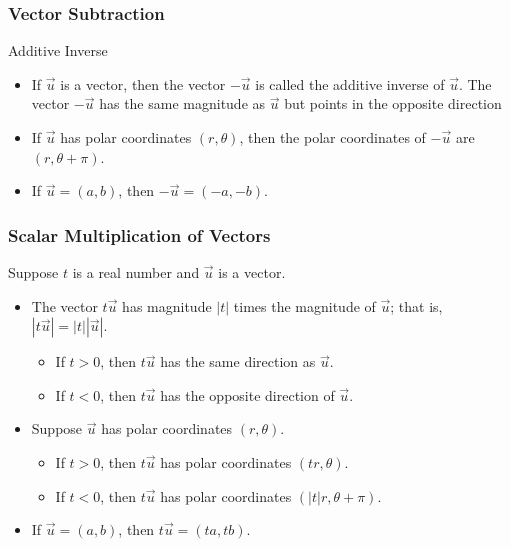 \documentclass{beamer}
\begin{document}
\begin{frame}
\frametitle{Vector Subtraction}
\begin{block}{Additive Inverse}
    \begin{itemize}
        \item If \(\vec u \) is a vector, then the vector \(-\vec u\) is called the additive inverse of \(\vec u\). The vector \(-\vec u\) has the same magnitude as \(\vec u\) but points in the opposite direction
        \item If \(\vec u\) has polar coordinates \((r, \theta)\), then the polar coordinates of \(-\vec u\) are \((r, \theta + \pi)\).
        \item If \(\vec u = (a,b)\), then \(-\vec u = (-a,-b)\).
    \end{itemize}
\end{block}
\end{frame}

\begin{frame}
    \frametitle{Scalar Multiplication of Vectors}
    Suppose \(t\) is a real number and \(\vec{u}\) is a vector.
    \begin{itemize}
        \item The vector \(t\vec{u}\) has magnitude \(|t|\) times the magnitude of \(\vec{u}\); that is, \(|t\vec{u}| = |t||\vec{u}|\).
        \begin{itemize}
            \item If \(t > 0\), then \(t\vec{u}\) has the same direction as \(\vec{u}\).
            \item If \(t < 0\), then \(t\vec{u}\) has the opposite direction of \(\vec{u}\).
        \end{itemize}
        \item Suppose \(\vec{u}\) has polar coordinates \((r, \theta)\).
        \begin{itemize}
            \item If \(t > 0\), then \(t\vec{u}\) has polar coordinates \((tr, \theta)\).
            \item If \(t < 0\), then \(t\vec{u}\) has polar coordinates \((|t|r, \theta + \pi)\).
        \end{itemize}
        \item If \(\vec{u} = (a, b)\), then \(t\vec{u} = (ta, tb)\).
    \end{itemize}
\end{frame}
\end{document}
